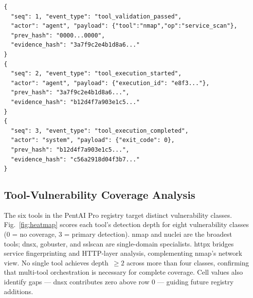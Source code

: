 \documentclass[conference]{IEEEtran}
\begin{document}
\begin{lstlisting}[style=terminal,caption={Audit chain — first three entries}]
{
  "seq": 1, "event_type": "tool_validation_passed",
  "actor": "agent", "payload": {"tool":"nmap","op":"service_scan"},
  "prev_hash": "0000...0000",
  "evidence_hash": "3a7f9c2e4b1d8a6..."
}
{
  "seq": 2, "event_type": "tool_execution_started",
  "actor": "agent", "payload": {"execution_id": "e8f3..."},
  "prev_hash": "3a7f9c2e4b1d8a6...",
  "evidence_hash": "b12d4f7a903e1c5..."
}
{
  "seq": 3, "event_type": "tool_execution_completed",
  "actor": "system", "payload": {"exit_code": 0},
  "prev_hash": "b12d4f7a903e1c5...",
  "evidence_hash": "c56a2918d04f3b7..."
}
\end{lstlisting}

\subsection{Tool-Vulnerability Coverage Analysis}

The six tools in the PentAI Pro registry target distinct vulnerability
classes. Fig.~\ref{fig:heatmap} scores each tool's detection depth for
eight vulnerability classes (0 = no coverage, 3 = primary detection).
nmap and nuclei are the broadest tools; dnsx, gobuster, and sslscan are
single-domain specialists. httpx bridges service fingerprinting and
HTTP-layer analysis, complementing nmap's network view.
No single tool achieves depth~$\geq 2$ across more than four classes,
confirming that multi-tool orchestration is necessary for complete
coverage. Cell values also identify gaps — dnsx contributes zero above
row 0 — guiding future registry additions.
\end{document}
